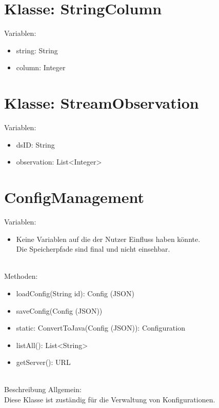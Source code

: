 \section{Klasse: StringColumn}
Variablen:
\begin{itemize}
	\item string: String
	\item column: Integer
\end{itemize} 

\section{Klasse: StreamObservation}
Variablen: 
\begin{itemize}
	\item dsID: String
	\item observation: List<Integer>
\end{itemize}

\section{ConfigManagement}
Variablen:
\begin{itemize}
	\item Keine Variablen auf die der Nutzer Einfluss haben könnte.\\
		Die Speicherpfade sind final und nicht einsehbar.
		
\end{itemize}
\ \\
Methoden:
\begin{itemize}
	\item loadConfig(String id): Config (JSON)
	\item saveConfig(Config (JSON))
	\item static: ConvertToJava(Config (JSON)): Configuration
	\item listAll(): List<String>
	\item getServer(): URL
\end{itemize}
\ \\
Beschreibung Allgemein:\\
Diese Klasse ist zuständig für die Verwaltung von Konfigurationen.

